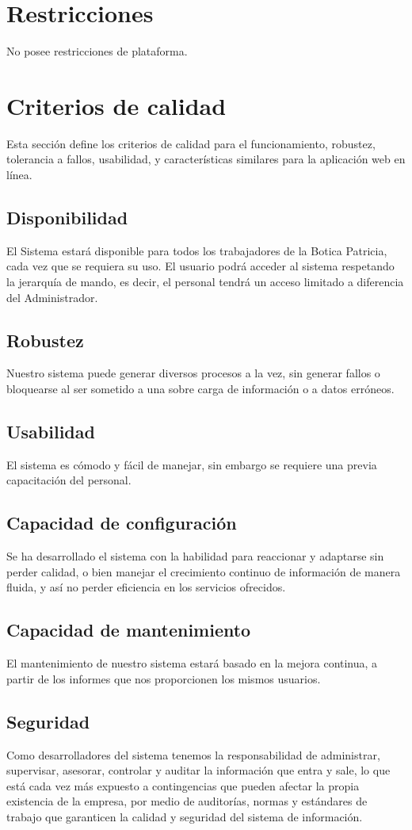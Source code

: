 \documentclass[a4paper,11pt, spanish]{report}
\begin{document}
{{{{{    \section{Restricciones}
      No posee restricciones de plataforma.
    \section{Criterios de calidad}
      Esta sección define los criterios de calidad para el funcionamiento, robustez, tolerancia a fallos, usabilidad, y características similares para la aplicación web en línea.
      \subsection{Disponibilidad}
        El Sistema estará disponible para todos los trabajadores de la Botica Patricia, cada vez que se requiera su uso. El usuario podrá acceder al sistema respetando la jerarquía de mando, es decir, el personal tendrá un acceso limitado a diferencia del Administrador.
      \subsection{Robustez}
        Nuestro sistema puede generar diversos procesos a la vez, sin generar fallos o bloquearse al ser sometido a una sobre carga de información o a datos erróneos.
      \subsection{Usabilidad}
        El sistema es cómodo y fácil de manejar, sin embargo se requiere una previa capacitación del personal.
      \subsection{Capacidad de configuración}
        Se ha desarrollado el sistema con la habilidad para reaccionar y adaptarse sin perder calidad, o bien manejar el crecimiento continuo de información de manera fluida, y así no perder eficiencia en los servicios ofrecidos.
      \subsection{Capacidad de mantenimiento}
      El mantenimiento de nuestro sistema estará basado en la mejora continua, a partir de los informes que nos proporcionen los mismos usuarios.
      \subsection{Seguridad}
      Como desarrolladores del sistema tenemos la responsabilidad de administrar, supervisar, asesorar, controlar y auditar la información que entra y sale, lo que está cada vez más expuesto a contingencias que pueden afectar la propia existencia de la empresa, por medio de auditorías, normas y estándares de trabajo que garanticen la calidad y seguridad del  sistema de información.
      
}}}}}
\end{document}
